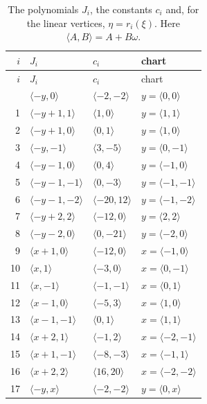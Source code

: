 \documentclass[11pt]{article}
\begin{document}
\begingroup\small
\setlength{\LTcapwidth}{\textwidth}
\begin{longtable}{@{}rlll@{}}
\caption{The polynomials $J_i$, the constants $c_i$ and, for the linear vertices, $\eta=r_i(\xi)$. Here $\langle A,B\rangle=A+B\omega$.}\label{tab:cvert1}\\
\hline $i$ & $J_i$ & $c_i$ & chart\\\hline\endfirsthead\hline $i$ & $J_i$ & $c_i$ & chart\\\hline\endhead\hline\endfoot
0 & $\langle -y,0\rangle$ & $\langle -2,-2\rangle$ & $y=\langle 0,0\rangle$\\
1 & $\langle -y+1,1\rangle$ & $\langle 1,0\rangle$ & $y=\langle 1,1\rangle$\\
2 & $\langle -y+1,0\rangle$ & $\langle 0,1\rangle$ & $y=\langle 1,0\rangle$\\
3 & $\langle -y,-1\rangle$ & $\langle 3,-5\rangle$ & $y=\langle 0,-1\rangle$\\
4 & $\langle -y-1,0\rangle$ & $\langle 0,4\rangle$ & $y=\langle -1,0\rangle$\\
5 & $\langle -y-1,-1\rangle$ & $\langle 0,-3\rangle$ & $y=\langle -1,-1\rangle$\\
6 & $\langle -y-1,-2\rangle$ & $\langle -20,12\rangle$ & $y=\langle -1,-2\rangle$\\
7 & $\langle -y+2,2\rangle$ & $\langle -12,0\rangle$ & $y=\langle 2,2\rangle$\\
8 & $\langle -y-2,0\rangle$ & $\langle 0,-21\rangle$ & $y=\langle -2,0\rangle$\\
9 & $\langle x+1,0\rangle$ & $\langle -12,0\rangle$ & $x=\langle -1,0\rangle$\\
10 & $\langle x,1\rangle$ & $\langle -3,0\rangle$ & $x=\langle 0,-1\rangle$\\
11 & $\langle x,-1\rangle$ & $\langle -1,-1\rangle$ & $x=\langle 0,1\rangle$\\
12 & $\langle x-1,0\rangle$ & $\langle -5,3\rangle$ & $x=\langle 1,0\rangle$\\
13 & $\langle x-1,-1\rangle$ & $\langle 0,1\rangle$ & $x=\langle 1,1\rangle$\\
14 & $\langle x+2,1\rangle$ & $\langle -1,2\rangle$ & $x=\langle -2,-1\rangle$\\
15 & $\langle x+1,-1\rangle$ & $\langle -8,-3\rangle$ & $x=\langle -1,1\rangle$\\
16 & $\langle x+2,2\rangle$ & $\langle 16,20\rangle$ & $x=\langle -2,-2\rangle$\\
17 & $\langle -y,x\rangle$ & $\langle -2,-2\rangle$ & $y=\langle 0,x\rangle$\\

\end{longtable}
\end{document}
